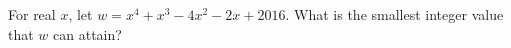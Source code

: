For real $ x $, let $ w=x^4+x^3-4x^2-2x+2016 $. What is the smallest integer value that $ w $ can attain?
